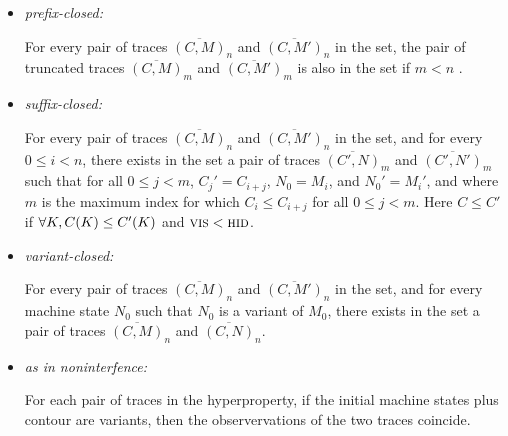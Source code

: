 \documentclass[conference]{IEEEtran}
\begin{document}
\begin{itemize}
\item {\em prefix-closed:}

  For every pair of traces $\overline{(C, M)}_n$ and $\overline{(C,
    M')}_n$ in the set,  the
  pair of truncated traces $\overline{(C, 
    M)}_m$ and $\overline{(C, M')}_m$ is also in the set if $m < n$ . 

\item {\em suffix-closed:}

  For every pair of traces $\overline{(C, M)}_n$ and $\overline{(C,
    M')}_n$ in the set, and for every $0 \leq i < n$, there exists in
  the set a pair of traces $\overline{(C', N)}_m$ and $\overline{(C',
    N')}_m$ such that for all $0 \leq j < m$, $C_j' = C_{i+j}$, $N_0 =
  M_i$, and $N_0' = M_i'$, and where $m$ is the maximum index for
  which $C_i \leq C_{i+j}$ for all $0 \leq j < m$. Here $C \leq C'$ if
  $\forall K, C(K) \leq C'(K)$ and $\textsc{vis} <
  \textsc{hid}$.  
  
\item {\em variant-closed:}

  For every pair of traces $\overline{(C, M)}_n$ and $\overline{(C,
    M')}_n$ in the set, and for every machine state $N_0$ such that
  $N_0$ is a variant of $M_0$, there exists in the set a pair of
  traces $\overline{(C, M)}_n$ and $\overline{(C, N)}_n$.


\item {\em as in noninterfence:}

  For each pair of traces in the hyperproperty, if the initial machine
  states plus contour  are variants, then the observervations of the
  two traces coincide.
  
\end{itemize}

\end{document}
